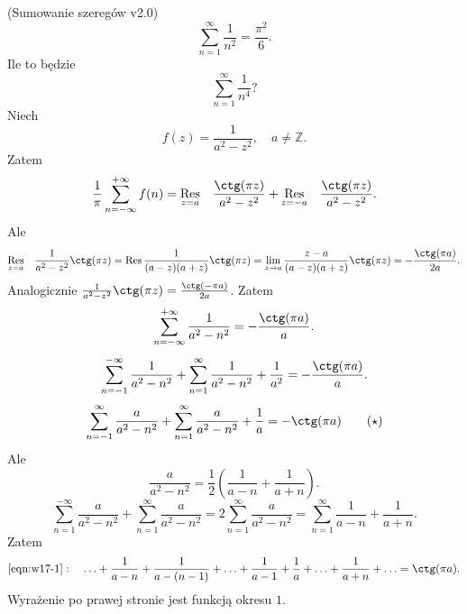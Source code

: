 \documentclass[../main.tex]{subfiles}
\begin{document}
\begin{przyklad}
    (Sumowanie szeregów v2.0)\\
    \[
    \sum_{n=1}^{\infty} \frac{1}{n^2} = \frac{\pi^2}{6}
    .\]
Ile to będzie \[
\sum_{n=1}^{\infty} \frac{1}{n^4}?
\]
    Niech
    \[
        f(z) = \frac{1}{a^2 - z^2},\quad a\neq \mathbb{Z}
    .\]
Zatem
\[
    \frac{1}{\pi}\sum_{n=-\infty}^{+\infty} f(n) = \underset{z = a}{\Res} \quad \frac{\ctg(\pi z)}{a^2 - z^2} + \underset{z = -a}{\Res} \quad \frac{\ctg(\pi z)}{a^2 -z^2}
.\]
Ale
\[
    \underset{z = a}{\Res} \quad \frac{1}{a^2 - z^2}\ctg(\pi z) = \Res \frac{1}{(a-z)(a+z)} \ctg(\pi z) = \lim\limits_{z\to a} \frac{z-a}{(a-z)(a+z)}\ctg(\pi z) = -\frac{\ctg(\pi a)}{2a}
.\]
Analogicznie $\frac{1}{a^2 - z^2}\ctg(\pi z) = \frac{\ctg(-\pi a)}{2a}$. Zatem
\[
    \sum_{n=-\infty}^{+\infty} \frac{1}{a^2-n^2} = - \frac{\ctg(\pi a)}{a}
.\]
\[
    \sum_{n=-1}^{-\infty} \frac{1}{a^2 - n^2} + \sum_{n=1}^{\infty} \frac{1}{a^2 - n^2} + \frac{1}{a^2} = - \frac{\ctg(\pi a)}{a}
.\]
\begin{equation}
    \label{eqn:w17-1}
    \sum_{n=-1}^{\infty} \frac{a}{a^2 - n^2} + \sum_{n=1}^{\infty} \frac{a}{a^2 - n^2} + \frac{1}{a} = -\ctg(\pi a)\tag{$\star$}
\end{equation}
Ale
\[
    \frac{a}{a^2 - n^2} = \frac{1}{2}\left( \frac{1}{a-n} + \frac{1}{a+n} \right)
.\]
\[
    \sum_{n=1}^{-\infty} \frac{a}{a^2 - n^2} + \sum_{n=1}^{\infty} \frac{a}{a^2 - n^2} = 2 \sum_{n=1}^{\infty} \frac{a}{a^2 - n^2} = \sum_{n=1}^{\infty} \frac{1}{a-n} + \frac{1}{a+n}
.\]
Zatem
\[
    \eqref{eqn:w17-1}:\quad \ldots + \frac{1}{a-n} + \frac{1}{a-(n-1)} + \ldots + \frac{1}{a-1} + \frac{1}{a} + \ldots + \frac{1}{a+n} + \ldots = \ctg(\pi a)
.\]
Wyrażenie po prawej stronie jest funkcją okresu $1$.
\end{przyklad}
\end{document}
